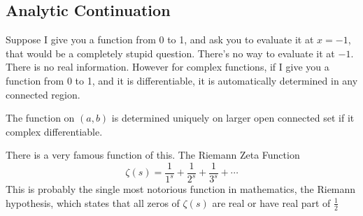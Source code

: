 \documentclass{article}
\begin{document}
\subsection{Analytic Continuation}
Suppose I give you a function from 0 to 1, and ask you to evaluate it at $x = -1$, that would be a
completely stupid question. There's no way to evaluate it at $-1$. There is no real information.
However for complex functions, if I give you a function from 0 to 1, and it is differentiable, it is
automatically determined in any connected region.

\noindent The function on $(a,b)$ is determined uniquely on larger open connected set if it complex differentiable.

\noindent There is a very famous function of this. The Riemann Zeta Function
\begin{displaymath}
	\zeta(s) = \frac{1}{1^s}	+ \frac{1}{2^s}	+ \frac{1}{3^s}	+ \cdots
\end{displaymath}
This is probably the single most notorious function in mathematics, the Riemann hypothesis, which
states that all zeros of $\zeta (s)$ are real or have real part of $\frac{1}{2}$
\end{document}
